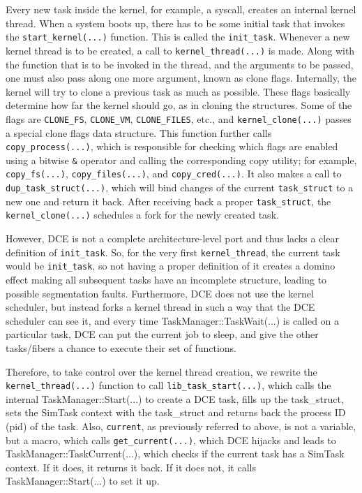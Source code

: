\documentclass{sig-alternate}
\begin{document}
\sloppy Every new task inside the kernel, for example, a syscall, 
creates an internal kernel thread.  When a system boots up, there has to be some initial task that invokes the \texttt{start\_kernel(...)} 
function. This is called the \texttt{init\_task}. Whenever a new kernel thread is to be created, a call to \texttt{kernel\_thread(...)} is made. Along with the 
function that is to be invoked in the thread, and the arguments to be passed, one must also pass along one more argument, known as clone flags. 
Internally, the kernel will try to clone a previous task as much as possible. These flags basically determine 
how far the kernel should go, as in cloning the structures. Some of the flags are \texttt{CLONE\_FS}, \texttt{CLONE\_VM}, \texttt{CLONE\_FILES}, etc., 
and \texttt{kernel\_clone(...)} passes a special clone flags data structure. This function further calls \texttt{copy\_process(...)}, which is responsible for checking 
which flags are enabled using a bitwise \texttt{\&} operator and calling the corresponding copy utility; for example, \texttt{copy\_fs(...)}, \texttt{copy\_files(...)}, 
and \texttt{copy\_cred(...)}.  It also makes a call to \texttt{dup\_task\_struct(...)}, which will bind changes of the current \texttt{task\_struct} to a new one and 
return it back. After receiving back a proper \texttt{task\_struct}, the \texttt{kernel\_clone(...)} schedules a fork for the newly created task.

\sloppy However, DCE is not a complete architecture-level port and thus lacks a 
clear definition of \texttt{init\_task}. So, for the very first \texttt{kernel\_thread}, the current task would be \texttt{init\_task}, 
so not having a proper definition of it creates a domino effect making all subsequent tasks have an incomplete structure, leading to possible segmentation faults.  
Furthermore, DCE does not use the kernel scheduler, but instead forks a kernel thread in such a way that the DCE scheduler can see it, and every time 
TaskManager::TaskWait(...)  is called on a particular task, DCE can put the current job to sleep, and give the other tasks/fibers a chance to 
execute their set of functions. 

\sloppy Therefore, to take  control over the kernel thread creation, we rewrite the \texttt{kernel\_thread(...)} function to call 
\texttt{lib\_task\_start(...)}, which calls the 
internal TaskManager::Start(...) to create a DCE task, fills up the task\_struct, sets the SimTask context with the task\_struct and returns back 
the process ID (pid) of the task. Also, \texttt{current}, as previously referred to above, is not a variable, but a macro, which calls \texttt{get\_current(...)}, which DCE hijacks and leads to TaskManager::TaskCurrent(...), which checks if the current task has a SimTask context. If it does, it returns it back. 
If it does not, it calls TaskManager::Start(...) to set it up.
 
\end{document}
